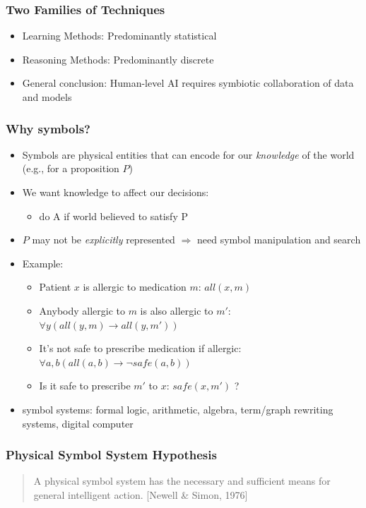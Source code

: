 \documentclass{beamer}
\begin{document}
\begin{frame}
\frametitle{Two Families of Techniques}
\begin{itemize}
\item Learning Methods: Predominantly statistical
\item Reasoning Methods: Predominantly discrete
\item General conclusion: Human-level AI requires symbiotic
  collaboration of data and models
\end{itemize}
\end{frame}

\begin{frame}
\frametitle{Why symbols?}
\begin{itemize}
\item Symbols are physical entities that can encode for our {\em
    knowledge} of the world (e.g., for a proposition $P$)
\item We want knowledge to affect our decisions:
  \begin{itemize}
  \item do A if world believed to satisfy P
  \end{itemize}
\item $P$ may not be {\em explicitly} represented $\Rightarrow$ need
  symbol manipulation and search
\item Example:
  \begin{itemize}
  \item Patient $x$ is allergic to medication $m$: $all(x,m)$
  \item Anybody allergic to $m$ is also allergic to $m'$: $\forall
    y(all(y,m) \rightarrow all(y,m'))$
  \item It's not safe to prescribe medication if allergic: $\forall a,
    b (all(a,b) \rightarrow \neg safe(a,b))$
  \item Is it safe to prescribe $m'$ to $x$: $safe(x, m')$ ?
  \end{itemize}
\item symbol systems: formal logic, arithmetic, algebra, term/graph
  rewriting systems, digital computer
\end{itemize}
\end{frame}

\begin{frame}
  \frametitle{Physical Symbol System Hypothesis}
  \begin{quote}
    A physical symbol system has
    the necessary and sufficient means for general intelligent
    action. [Newell \& Simon, 1976]
  \end{quote}
\end{frame}
\end{document}
